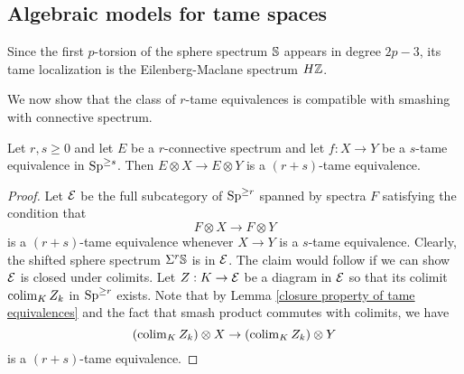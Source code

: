 	




	

\subsection{Algebraic models for tame spaces}
\begin{remark}
	Since the first $p$-torsion of the sphere spectrum ${\mathbb{S}}$ appears in degree $2p-3$, its tame localization is the Eilenberg-Maclane spectrum $H{\mathbb{Z}}$.
\end{remark}

We now show that the class of $r$-tame equivalences is compatible with smashing with connective spectrum.
\begin{lemma}
\label{Shift of tame equivalences}
Let $r,s\geq 0$ and
let $E$ be a $r$-connective spectrum and let $f:X\to Y$ be a $s$-tame equivalence in $\operatorname{Sp}^{\geq s}$. Then $E\otimes X \to E\otimes Y$ is a $(r+s)$-tame equivalence.
\end{lemma}
\begin{proof}
Let ${\mathcal{E}}$ be the full subcategory of $\operatorname{Sp}^{\geq r}$ spanned by spectra $F$ satisfying the condition that
$$
F\otimes X \to F\otimes Y
$$
is a $(r+s)$-tame equivalence whenever $X\to Y$ is a $s$-tame equivalence. Clearly, the shifted sphere spectrum $\Sigma^{r}{\mathbb{S}}$ is in ${\mathcal{E}}$. 
The claim would follow if we can show ${\mathcal{E}}$ is closed under colimits. Let $Z:K\to {\mathcal{E}}$ be a diagram in ${\mathcal{E}}$ so that its colimit $\operatorname{colim}_K Z_k$ in $\operatorname{Sp}^{\geq r}$ exists.
Note that by Lemma \ref{closure property of tame equivalences} and the fact that smash product commutes with colimits, we have
$$
(\operatorname{colim}_K Z_k )\otimes X \to (\operatorname{colim}_K Z_k )\otimes Y
$$
is a $(r+s)$-tame equivalence.

\end{proof}


